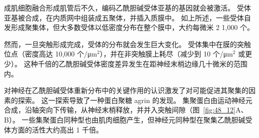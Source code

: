 成肌细胞融合形成肌管后不久，编码乙酰胆碱受体亚基的基因就会被激活。
受体亚基被合成，在内质网中组装成五聚体，并插入质膜中。
如上所述，一些受体自发形成聚集体，但大多数受体以低密度分布在整个膜中，大约每微米 2 1,000 个。


然而，一旦突触形成完成，受体的分布就会发生巨大变化。
受体集中在膜的突触位点（密度高达 10,000 个/μm$ ^2 $），并在非突触膜上耗尽（减少到 10 个/μm$ ^2 $ 或更少）。
这种千倍的乙酰胆碱受体密度差异发生在距神经末梢边缘几十微米的范围内。


对神经在乙酰胆碱受体重新分布中的关键作用的认识激发了对可能促进其聚集的因素的探索。
这一探索导致了一种蛋白聚糖 agrin 的发现。
集聚蛋白由运动神经元合成，沿轴突向下传输，从神经末梢释放，并并入突触间隙（图~\ref{fig:48_12}A、B）。
一些集聚蛋白同种型也由肌肉细胞产生，但神经元同种型在聚集乙酰胆碱受体方面的活性大约高出 1 千倍。


